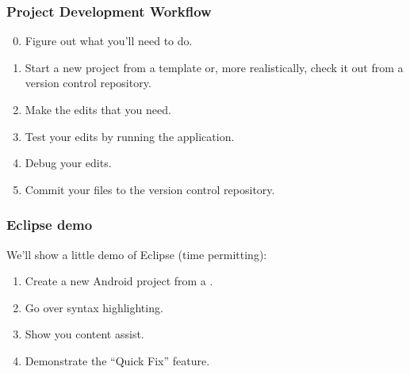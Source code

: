 \begin{frame}
\frametitle{Project Development Workflow}

\begin{changemargin}{1cm}
\Large
\begin{enumerate}
\setcounter{enumi}{-1}
\item Figure out what you'll need to do.
\item Start a new project from a template or, more realistically,
  check it out from a version control repository.
\item Make the edits that you need. 
\item Test your edits by running the application.
\item Debug your edits.
\item Commit your files to the version control repository.
\end{enumerate}
\end{changemargin}
\end{frame}

\begin{frame}
\frametitle{Eclipse demo}

\begin{changemargin}{1cm}
We'll show a little demo of Eclipse (time permitting):
\begin{enumerate}
	\item Create a new Android project from a .
	\item Go over syntax highlighting.
	\item Show you content assist.
	\item Demonstrate the ``Quick Fix'' feature.
\end{enumerate}
\end{changemargin}

\end{frame}




